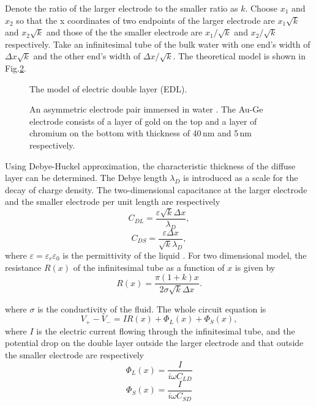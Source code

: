 \documentclass[journal,svgnames,twocolumn,x11names]{IEEEtran}
\begin{document}
Denote the ratio of the larger electrode to the smaller ratio as $k$. Choose $x_1$ and $x_2$ so that the x coordinates of two endpoints of the larger electrode are $x_1\sqrt{k}$ and $x_2\sqrt{k}$ and those of the the smaller electrode are $x_1/\sqrt{k}$ and $x_2/\sqrt{k}$ respectively. Take an infinitesimal tube of the bulk water with one end's width of $\Delta x\sqrt{k}$ and the other end's width of $\Delta x/\sqrt{k}$. The theoretical model is shown in Fig.\ref{fig:math_model}.
\begin{figure}[H]
    \centering
    
    \caption{The model of electric double layer (EDL).}
    \label{fig:edl}
\end{figure}
\vspace{-0.6cm}
\begin{figure}[H]
    \centering
    
    \caption{An asymmetric electrode pair immersed in water \cite{physrevep}. The Au-Ge electrode consists of a layer of gold on the top and a layer of chromium on the bottom with thickness of 40\,nm and 5\,nm respectively.}
    \label{fig:math_model}
\end{figure}
\vspace{-0.3cm}
Using Debye-Huckel approximation, the characteristic thickness of the diffuse layer can be determined. The Debye length $\lambda_D$ is introduced as a scale for the decay of charge density. The two-dimensional capacitance at the larger electrode and the smaller electrode per unit length are respectively
\begin{equation}
    C_{DL}=\frac{\varepsilon\sqrt{k}\Delta x}{\lambda_D},
\end{equation}
\begin{equation}
    C_{DS}=\frac{\varepsilon\Delta x}{\sqrt{k}\lambda_D},
\end{equation}
where $\varepsilon=\varepsilon_r\varepsilon_0$ is the permittivity of the liquid \cite{physrevep}. For two dimensional model, the resistance $R(x)$ of the infinitesimal tube as a function of $x$ is given by
\begin{equation}
    R(x)=\frac{\pi(1+k)x}{2\sigma\sqrt{k}\Delta x}.
\end{equation}

where $\sigma$ is the conductivity of the fluid. The whole circuit equation is
\begin{equation}
    V_+-V_-=IR(x)+\Phi_L(x)+\Phi_S(x),
\end{equation}
where $I$ is the electric current flowing through the infinitesimal tube, and the potential drop on the double layer outside the larger electrode and that outside the smaller electrode are respectively
\begin{equation}
    \Phi_L(x)=\frac{I}{i\omega C_{LD}}
\end{equation}
\begin{equation}
    \Phi_S(x)=\frac{I}{i\omega C_{SD}}
\end{equation}
\end{document}

